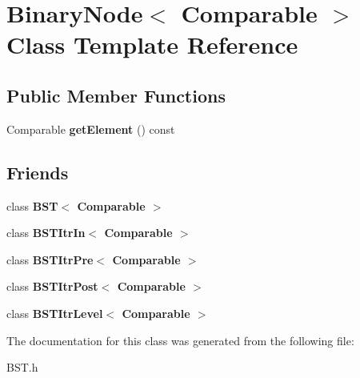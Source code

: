\hypertarget{class_binary_node}{}\section{Binary\+Node$<$ Comparable $>$ Class Template Reference}
\label{class_binary_node}
\subsection*{Public Member Functions}
\begin{DoxyCompactItemize}
\item 
Comparable {\bfseries get\+Element} () const \hypertarget{class_binary_node_ac3603205cbb4aeb22f810550b8785986}{}\label{class_binary_node_ac3603205cbb4aeb22f810550b8785986}

\end{DoxyCompactItemize}
\subsection*{Friends}
\begin{DoxyCompactItemize}
\item 
class {\bfseries B\+S\+T$<$ Comparable $>$}\hypertarget{class_binary_node_a28a1adb9906f3ff7e12c2cb6fa2bd54e}{}\label{class_binary_node_a28a1adb9906f3ff7e12c2cb6fa2bd54e}

\item 
class {\bfseries B\+S\+T\+Itr\+In$<$ Comparable $>$}\hypertarget{class_binary_node_aab3993acac2ab24a0b59edb0c3acc775}{}\label{class_binary_node_aab3993acac2ab24a0b59edb0c3acc775}

\item 
class {\bfseries B\+S\+T\+Itr\+Pre$<$ Comparable $>$}\hypertarget{class_binary_node_a45a55df6f11541416d4ea7684c575c1a}{}\label{class_binary_node_a45a55df6f11541416d4ea7684c575c1a}

\item 
class {\bfseries B\+S\+T\+Itr\+Post$<$ Comparable $>$}\hypertarget{class_binary_node_a5dc153694be266f6e772659486219da7}{}\label{class_binary_node_a5dc153694be266f6e772659486219da7}

\item 
class {\bfseries B\+S\+T\+Itr\+Level$<$ Comparable $>$}\hypertarget{class_binary_node_a26ff00bc0d87069aed877f10fd3c80a8}{}\label{class_binary_node_a26ff00bc0d87069aed877f10fd3c80a8}

\end{DoxyCompactItemize}


The documentation for this class was generated from the following file\+:\begin{DoxyCompactItemize}
\item 
B\+S\+T.\+h\end{DoxyCompactItemize}
